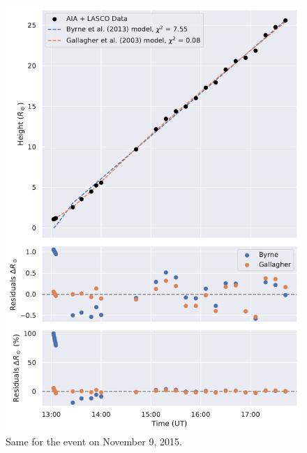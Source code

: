 \begin{figure}[!htp]
	\centering
	\includegraphics[width=0.8\hsize]{chapter2/figs/appendix/height_profile_residuals_aia_lasco_151109_01.pdf}
	\caption{Same for the event on November 9, 2015.}
\end{figure}

